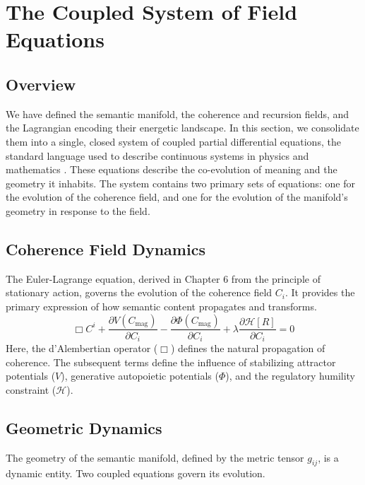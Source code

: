 \chapter{The Coupled System of Field Equations}

\section{Overview}

We have defined the semantic manifold, the coherence and recursion fields, and the Lagrangian encoding their energetic landscape. In this section, we consolidate them into a single, closed system of coupled partial differential equations, the standard language used to describe continuous systems in physics and mathematics \autocite{Evans2010}. These equations describe the co-evolution of meaning and the geometry it inhabits. The system contains two primary sets of equations: one for the evolution of the coherence field, and one for the evolution of the manifold's geometry in response to the field.

\section{Coherence Field Dynamics}

The Euler-Lagrange equation, derived in Chapter 6 from the principle of stationary action, governs the evolution of the coherence field \(C_i\). It provides the primary expression of how semantic content propagates and transforms.
\begin{equation}
\Box C^i + \frac{\partial V(C_{\mathrm{mag}})}{\partial C_i} - \frac{\partial \Phi(C_{\mathrm{mag}})}{\partial C_i} + \lambda \frac{\partial \mathcal{H}[R]}{\partial C_i} = 0
\end{equation}
Here, the d'Alembertian operator (\(\Box\)) defines the natural propagation of coherence. The subsequent terms define the influence of stabilizing attractor potentials (\(V\)), generative autopoietic potentials (\(\Phi\)), and the regulatory humility constraint (\(\mathcal{H}\)).

\section{Geometric Dynamics}

The geometry of the semantic manifold, defined by the metric tensor \(g_{ij}\), is a dynamic entity. Two coupled equations govern its evolution.

